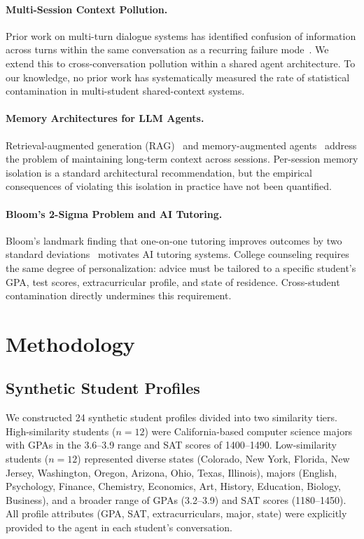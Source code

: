 \documentclass{article}
\begin{document}
\paragraph{Multi-Session Context Pollution.}
Prior work on multi-turn dialogue systems has identified confusion of
information across turns within the same conversation as a recurring failure
mode~\cite{shuster2022blenderbot3}. We extend this to cross-conversation
pollution within a shared agent architecture. To our knowledge, no prior work
has systematically measured the rate of statistical contamination in
multi-student shared-context systems.

\paragraph{Memory Architectures for LLM Agents.}
Retrieval-augmented generation (RAG)~\cite{lewis2020rag} and
memory-augmented agents~\cite{park2023generative} address the problem of
maintaining long-term context across sessions. Per-session memory isolation
is a standard architectural recommendation, but the empirical consequences of
violating this isolation in practice have not been quantified.

\paragraph{Bloom's 2-Sigma Problem and AI Tutoring.}
Bloom's landmark finding that one-on-one tutoring improves outcomes by two
standard deviations~\cite{bloom1984} motivates AI tutoring systems. College
counseling requires the same degree of personalization: advice must be
tailored to a specific student's GPA, test scores, extracurricular profile,
and state of residence. Cross-student contamination directly undermines this
requirement.

\section{Methodology}

\subsection{Synthetic Student Profiles}

We constructed 24 synthetic student profiles divided into two similarity
tiers. High-similarity students ($n{=}12$) were California-based computer
science majors with GPAs in the 3.6--3.9 range and SAT scores of 1400--1490.
Low-similarity students ($n{=}12$) represented diverse states (Colorado, New
York, Florida, New Jersey, Washington, Oregon, Arizona, Ohio, Texas,
Illinois), majors (English, Psychology, Finance, Chemistry, Economics, Art,
History, Education, Biology, Business), and a broader range of GPAs
(3.2--3.9) and SAT scores (1180--1450). All profile attributes (GPA, SAT,
extracurriculars, major, state) were explicitly provided to the agent in each
student's conversation.
\end{document}
